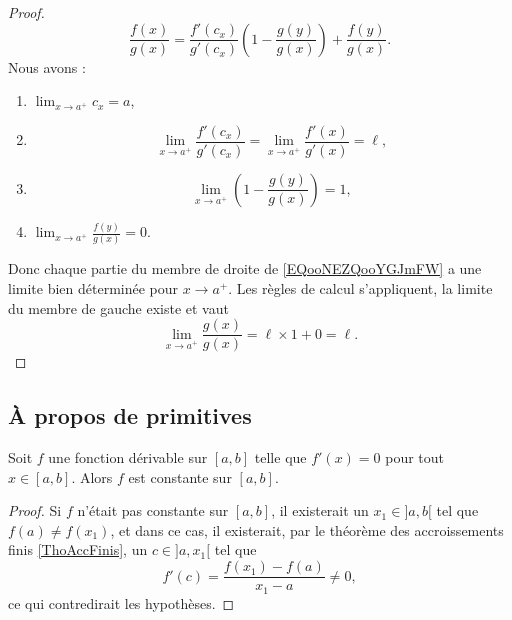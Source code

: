 \begin{proof}
    \begin{equation}        \label{EQooNEZQooYGJmFW}
        \frac{ f(x) }{ g(x) }=\frac{ f'(c_x) }{ g'(c_x) }\left( 1-\frac{ g(y) }{ g(x) } \right)+\frac{ f(y) }{ g(x) }.
    \end{equation}
    Nous avons :
    \begin{enumerate}
        \item
            \( \lim_{x\to a^+} c_x=a\),
        \item
            \begin{equation}
                \lim_{x\to a^+}\frac{ f'(c_x) }{ g'(c_x) }=\lim_{x\to a^+} \frac{ f'(x) }{ g'(x) }=\ell, 
            \end{equation}
        \item
            \begin{equation}
                \lim_{x\to a^+} \left( 1-\frac{ g(y) }{ g(x) } \right)=1,
            \end{equation}
        \item
            \( \lim_{x\to a^+} \frac{ f(y) }{ g(x) }=0\).
    \end{enumerate}
    Donc chaque partie du membre de droite de \eqref{EQooNEZQooYGJmFW} a une limite bien déterminée pour \( x\to a^+\). Les règles de calcul s'appliquent, la limite du membre de gauche existe et vaut
    \begin{equation}
        \lim_{x\to a^+} \frac{ g(x) }{ g(x) }=\ell\times 1+0=\ell.
    \end{equation}
\end{proof}

\subsection{À propos de primitives}

\begin{corollary}       \label{CORooEOERooYprteX}
Soit $f$ une fonction dérivable sur $[a,b]$ telle que $f'(x) = 0$ pour tout $x \in [a,b]$. Alors $f$ est constante sur $[a,b]$.
\end{corollary}

\begin{proof}
    Si $f$ n'était pas constante sur $[a,b]$, il existerait un $x_1\in ]a,b[$ tel que $f(a)\neq f(x_1)$, et dans ce cas, il existerait, par le théorème des accroissements finis \ref{ThoAccFinis}, un $c\in]a,x_1[$ tel que 
    \begin{equation}
        f'(c)=\frac{ f(x_1)-f(a) }{ x_1-a }\neq 0,
    \end{equation}
    ce qui contredirait les hypothèses.
\end{proof}

